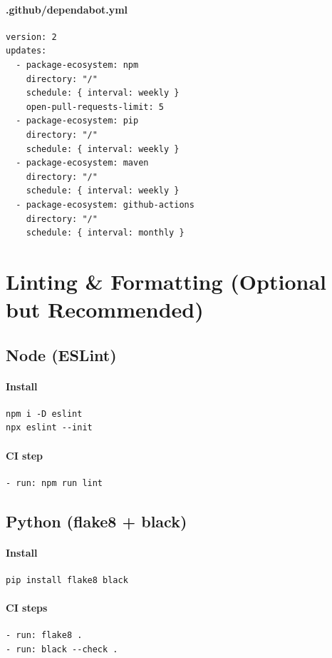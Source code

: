 \documentclass[11pt]{article}
\begin{document}
\paragraph{.github/dependabot.yml}
\begin{verbatim}
version: 2
updates:
  - package-ecosystem: npm
    directory: "/"
    schedule: { interval: weekly }
    open-pull-requests-limit: 5
  - package-ecosystem: pip
    directory: "/"
    schedule: { interval: weekly }
  - package-ecosystem: maven
    directory: "/"
    schedule: { interval: weekly }
  - package-ecosystem: github-actions
    directory: "/"
    schedule: { interval: monthly }
\end{verbatim}

\section{Linting \& Formatting (Optional but Recommended)}
\subsection{Node (ESLint)}
\paragraph{Install}
\begin{verbatim}
npm i -D eslint
npx eslint --init
\end{verbatim}

\paragraph{CI step}
\begin{verbatim}
- run: npm run lint
\end{verbatim}

\subsection{Python (flake8 + black)}
\paragraph{Install}
\begin{verbatim}
pip install flake8 black
\end{verbatim}

\paragraph{CI steps}
\begin{verbatim}
- run: flake8 .
- run: black --check .
\end{verbatim}
\end{document}
